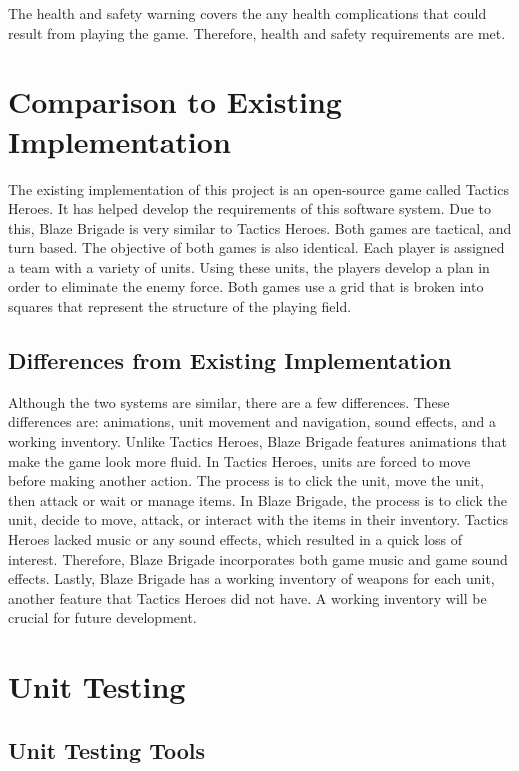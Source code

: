 \documentclass{article}
\begin{document}
The health and safety warning covers the any health complications that could result from playing the game. Therefore, health and safety requirements are met.
	
\section{Comparison to Existing Implementation}

The existing implementation of this project is an open-source game called Tactics Heroes. It has helped develop the requirements of this software system. Due to this, Blaze Brigade is very similar to Tactics Heroes. Both games are tactical, and turn based. The objective of both games is also identical. Each player is assigned a team with a variety of units. Using these units, the players develop a plan in order to eliminate the enemy force. Both games use a grid that is broken into squares that represent the structure of the playing field.

\subsection{Differences from Existing Implementation}

Although the two systems are similar, there are a few differences. These differences are: animations, unit movement and navigation, sound effects, and a working inventory. Unlike Tactics Heroes, Blaze Brigade features animations that make the game look more fluid. In Tactics Heroes, units are forced to move before making another action. The process is to click the unit, move the unit, then attack or wait or manage items. In Blaze Brigade, the process is to click the unit, decide to move, attack, or interact with the items in their inventory. Tactics Heroes lacked music or any sound effects, which resulted in a quick loss of interest. Therefore, Blaze Brigade incorporates both game music and game sound effects. Lastly, Blaze Brigade has a working inventory of weapons for each unit, another feature that Tactics Heroes did not have. A working inventory will be crucial for future development.

\section{Unit Testing}

\subsection{Unit Testing Tools}
\end{document}
